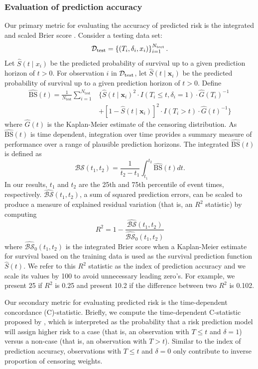\documentclass[twoside,11pt]{article}\usepackage[]{graphicx}\usepackage[]{xcolor}
\newcommand{\dataset}{{\cal D}}
\newcommand{\ie}{that is}
\newcommand{\bstat}{\widehat{\text{BS}}(t)}
\newcommand{\bsbar}{\mathcal{\widehat{BS}}(t_1, t_2)}
\newcommand{\bskap}{\mathcal{\widehat{BS}}_0(t_1, t_2)}
\newcommand{\ntest}{N_{\text{test}}}
\begin{document}
\subsubsection{Evaluation of prediction accuracy} \label{sec:prediction_accuracy}

Our primary metric for evaluating the accuracy of predicted risk is the integrated and scaled Brier score \citep{graf1999assessment}. Consider a testing data set:
$$\dataset_{\text{test}} = \left\{ (T_i, \delta_i, x_{i}) \right\}_{i=1}^{N_{\text{test}}}.$$
Let $\widehat{S}(t \mid x_i)$ be the predicted probability of survival up to a given prediction horizon of $t > 0$.
 For observation $i$ in $\dataset_{\text{test}}$, let $\widehat{S}(t \mid \bm{x}_i)$ be the predicted probability of survival up to a given prediction horizon of $t > 0$. Define \begin{align*}
\bstat = \frac{1}{\ntest} \sum_{i=1}^{\ntest} &\{ \widehat{S}(t \mid \bm{x}_i)^2 \cdot I(T_i \leq t, \delta_i = 1) \cdot \widehat{G}(T_i)^{-1} \\ &+ [1-\widehat{S}(t \mid \bm{x}_i)]^2 \cdot I(T_i > t) \cdot \widehat{G}(t)^{-1}\}
\end{align*} where $\widehat{G}(t)$ is the Kaplan-Meier estimate of the censoring distribution. As $\bstat$ is time dependent, integration over time provides a summary measure of performance over a range of plausible prediction horizons. The integrated $\bstat$ is defined as \begin{equation}
\bsbar = \frac{1}{t_2 - t_1}\int_{t_1}^{t_2} \widehat{\text{BS}}(t) dt.
\end{equation} In our results, $t_1$ and $t_2$ are the 25th and 75th percentile of event times, respectively. $\bsbar$, a sum of squared prediction errors, can be scaled to produce a measure of explained residual variation (\ie, an $R^2$ statistic) by computing \begin{equation}
R^2 = 1 - \frac{\bsbar}{\bskap}
\end{equation} where $\bskap$ is the integrated Brier score when a Kaplan-Meier estimate for survival based on the training data is used as the survival prediction function $\widehat{S}(t)$. We refer to this $R^2$ statistic as the index of prediction accuracy \citep{kattan2018index} and we scale its values by 100 to avoid unnecessary leading zero's. For example, we present 25 if $R^2$ is 0.25 and present 10.2 if the difference between two $R^2$ is 0.102.

Our secondary metric for evaluating predicted risk is the time-dependent concordance (C)-statistic. Briefly, we compute the time-dependent C-statistic proposed by \citet{blanche2013estimating}, which is interpreted as the probability that a risk prediction model will assign higher risk to a case (\ie, an observation with $T \leq t$ and $\delta = 1$) versus a non-case (\ie, an observation with $T > t$). Similar to the index of prediction accuracy, observations with $T \leq t$ and $\delta = 0$ only contribute to inverse proportion of censoring weights.
\end{document}
